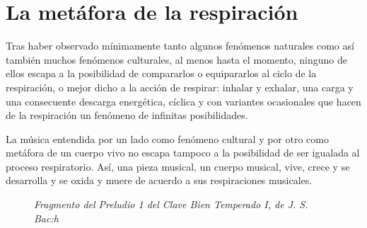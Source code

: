 \chapter {La metáfora de la respiración}
Tras haber observado mínimamente tanto algunos fenómenos naturales como así también muchos fenómenos culturales, al menos hasta el momento, ninguno de ellos escapa a la posibilidad de compararlos o equipararlos al ciclo de la respiración, o mejor dicho a la acción de respirar: inhalar y exhalar, una carga y una consecuente descarga energética, cíclica y con variantes ocasionales que hacen de la respiración un fenómeno de infinitas posibilidades.

La música entendida por un lado como fenómeno cultural y por otro como metáfora de un cuerpo vivo no escapa tampoco a la posibilidad de ser igualada al proceso respiratorio. Así, una pieza musical, un cuerpo musical, vive, crece y se desarrolla y se oxida y muere de acuerdo a sus respiraciones musicales.
\begin{figure}[h]
\begin{center}
\end{center}
\caption {\emph{Fragmento del Preludio 1 del \emph{Clave Bien Temperado I}, de J. S. Bac:h}}
\end{figure}

